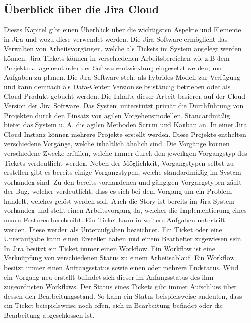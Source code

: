 \subsection{Überblick über die Jira Cloud}
Dieses Kapitel gibt einen Überblick über die wichtigsten Aspekte und Elemente in Jira und wozu diese verwendet werden. Die Jira Software ermöglicht das Verwalten von Arbeitsvorgängen, welche als Tickets im System angelegt werden können. Jira-Tickets können in verschiedenen Arbeitsbereichen wie z.B dem Projektmanagement oder der Softwareentwicklung eingesetzt werden, um Aufgaben zu planen. Die Jira Software steht als hybrides Modell zur Verfügung und kann demnach als Data-Center Version selbstständig betrieben oder als Cloud Produkt gebucht werden. Die Inhalte dieser Arbeit basieren auf der Cloud Version der Jira Software. Das System unterstützt primär die Durchführung von Projekten durch den Einsatz von agilen Vorgehensmodellen. Standardmäßig bietet das System u. A. die agilen Methoden Scrum und Kanban an. In einer Jira Cloud Instanz können mehrere Projekte erstellt werden. Diese Projekte enthalten verschiedene Vorgänge, welche inhaltlich ähnlich sind. Die Vorgänge können verschiedene Zwecke erfüllen, welche immer durch den jeweiligen Vorgangstyp des Tickets verdeutlicht werden. Neben der Möglichkeit, Vorgangstypen selbst zu erstellen gibt es bereits einige Vorgangstypen, welche standardmäßig im System vorhanden sind. Zu den bereits vorhandenen und gängigen Vorgangstypen zählt der \glqq Bug\grqq\:, welcher verdeutlicht, dass es sich bei dem Vorgang um ein Problem handelt, welches gelöst werden soll. Auch die \glqq Story\grqq\: ist bereits im Jira System vorhanden und stellt einen Arbeitsvorgang da, welcher die Implementierung eines neuen Features beschreibt. Ein Ticket kann in weitere Aufgaben unterteilt werden. Diese werden als Unteraufgaben bezeichnet. Ein Ticket oder eine Unteraufgabe kann einen Ersteller haben und einem Bearbeiter zugewiesen sein.\\
In Jira besitzt ein Ticket immer einen Workflow. Ein Workflow ist eine Verknüpfung von verschiedenen Status zu einem Arbeitsablauf. Ein Workflow besitzt immer einen Anfrangsstatus sowie einen oder mehrere Endstatus. Wird ein Vorgang neu erstellt befindet sich dieser im Anfangsstatus des ihm zugeordneten Workflows. Der Status eines Tickets gibt immer Aufschluss über dessen den Bearbeitungsstand. So kann ein Status beispielsweise andeuten, dass ein Ticket beispielsweise noch offen, sich in Bearbeitung befindet oder die Bearbeitung abgeschlossen ist.